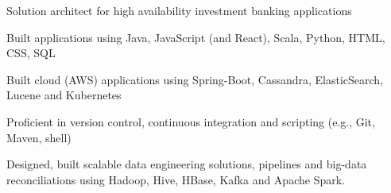 \begin{cvitems}
\sectionspace
\sectionspace
\vspace{1mm}
	\fontsize{11pt}{1.4em}\bodyfontlight\upshape\color{text}
        \item {Solution architect for high availability investment banking applications}
        \item {Built applications using Java, JavaScript (and React), Scala, Python, HTML, CSS, SQL}
        \item {Built cloud (AWS) applications using Spring-Boot, Cassandra, ElasticSearch, Lucene and Kubernetes}
        \item {Proficient in version control, continuous integration and scripting (e.g., Git, Maven, shell)}
        \item {Designed, built scalable data engineering solutions, pipelines and big-data reconciliations using Hadoop, Hive, HBase, Kafka and Apache Spark.}
        \end{cvitems}
\vspace{1mm}
\sectionspace
